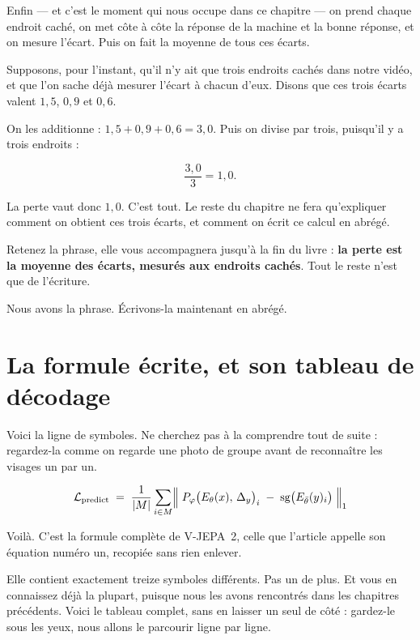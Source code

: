 Enfin — et c'est le moment qui nous occupe dans ce chapitre — on prend
chaque endroit caché, on met côte à côte la réponse de la machine et la
bonne réponse, et on mesure l'écart. Puis on fait la moyenne de tous ces
écarts.

\begin{exemple}
Supposons, pour l'instant, qu'il n'y ait que trois endroits cachés dans
notre vidéo, et que l'on sache déjà mesurer l'écart à chacun d'eux. Disons
que ces trois écarts valent $1{,}5$, $0{,}9$ et $0{,}6$.

On les additionne : $1{,}5 + 0{,}9 + 0{,}6 = 3{,}0$. Puis on divise par
trois, puisqu'il y a trois endroits :

\[
  \frac{3{,}0}{3} = 1{,}0 .
\]

La perte vaut donc $1{,}0$. C'est tout. Le reste du chapitre ne fera
qu'expliquer comment on obtient ces trois écarts, et comment on écrit ce
calcul en abrégé.
\end{exemple}

\begin{aretenir}
Retenez la phrase, elle vous accompagnera jusqu'à la fin du livre :
\textbf{la perte est la moyenne des écarts, mesurés aux endroits cachés}.
Tout le reste n'est que de l'écriture.
\end{aretenir}

Nous avons la phrase. Écrivons-la maintenant en abrégé.

\section{La formule écrite, et son tableau de décodage}

Voici la ligne de symboles. Ne cherchez pas à la comprendre tout de suite :
regardez-la comme on regarde une photo de groupe avant de reconnaître les
visages un par un.

\begin{equation}
  \mathcal{L}_{\text{predict}}
  \;=\;
  \frac{1}{|M|}
  \sum_{i \in M}
  \Bigl\|
    \; P_{\varphi}\bigl(E_{\theta}(x),\, \Delta_y\bigr)_i
    \;-\;
    \mathrm{sg}\bigl(E_{\bar{\theta}}(y)_i\bigr) \;
  \Bigr\|_{1}
  \label{eq:perte-vjepa2}
\end{equation}

Voilà. C'est la formule complète de V-JEPA~2, celle que l'article appelle
son équation numéro un, recopiée sans rien enlever.

Elle contient exactement treize symboles différents. Pas un de plus. Et vous
en connaissez déjà la plupart, puisque nous les avons rencontrés dans les
chapitres précédents. Voici le tableau complet, sans en laisser un seul de
côté : gardez-le sous les yeux, nous allons le parcourir ligne par ligne.

